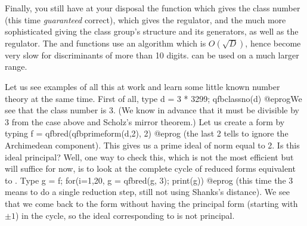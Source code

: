 Finally, you still have at your disposal the function  which
gives the class number (this time \emph{guaranteed} correct),
 which gives the regulator, and the much more sophisticated
 giving the class group's structure and its generators,
as well as the regulator. The  and 
functions use an algorithm which is $O(\sqrt D)$, hence become very slow for
discriminants of more than 10 digits.  can be used on a
much larger range.

Let us see examples of all this at work and learn some little known number
theory at the same time. First of all, type
\bprog
  d = 3 * 3299; qfbclassno(d)
@eprog\noindent We see that the class number is 3. (We know
in advance that it must be divisible by 3 from the  case above
and Scholz's mirror theorem.) Let us create a form by typing
\bprog
  f = qfbred(qfbprimeform(d,2), 2)
@eprog\noindent
(the last 2 tells  to ignore the Archimedean component). This
gives us a prime ideal of norm equal to 2. Is this ideal principal? Well, one
way to check this, which is not the most efficient but will suffice for now,
is to look at the complete cycle of reduced forms equivalent to . Type
\bprog
 g = f; for(i=1,20, g = qfbred(g, 3); print(g))
@eprog\noindent
(this time the 3 means to do a single reduction step, still not using
Shanks's distance). We see that we come back to the form  without
having the principal form (starting with $\pm1$) in the cycle, so the ideal
corresponding to  is not principal.

